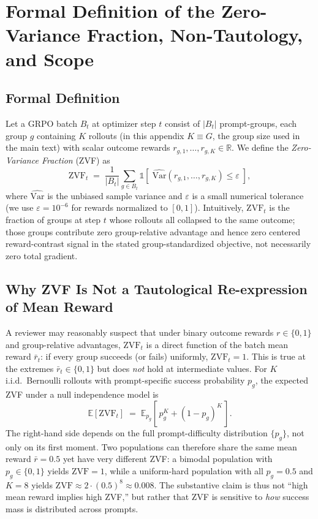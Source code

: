 \section{Formal Definition of the Zero-Variance Fraction, Non-Tautology, and Scope}
\label{sec:appendix:zvf-formalization}

\subsection{Formal Definition}

Let a GRPO batch $B_t$ at optimizer step $t$ consist of $|B_t|$ prompt-groups,
each group $g$ containing $K$ rollouts (in this appendix $K\equiv G$, the group size used in the main text) with scalar outcome rewards
$r_{g,1}, \ldots, r_{g,K} \in \mathbb{R}$. We define the \emph{Zero-Variance
Fraction} (ZVF) as
\begin{equation}
\label{eq:zvf}
\mathrm{ZVF}_t \;=\; \frac{1}{|B_t|} \sum_{g \in B_t}
  \mathbb{1}\!\left[\;\widehat{\mathrm{Var}}(r_{g,1}, \ldots, r_{g,K}) \le \varepsilon\;\right],
\end{equation}
where $\widehat{\mathrm{Var}}$ is the unbiased sample variance and
$\varepsilon$ is a small numerical tolerance
(we use $\varepsilon = 10^{-6}$ for rewards normalized to $[0,1]$).
Intuitively, $\mathrm{ZVF}_t$ is the fraction of groups at step $t$ whose
rollouts all collapsed to the same outcome; those groups contribute zero
group-relative advantage and hence zero centered reward-contrast signal in the
stated group-standardized objective, not necessarily zero total gradient.

\subsection{Why ZVF Is Not a Tautological Re-expression of Mean Reward}

A reviewer may reasonably suspect that under binary outcome rewards
$r \in \{0,1\}$ and group-relative advantages, $\mathrm{ZVF}_t$ is a direct
function of the batch mean reward $\bar{r}_t$: if every group succeeds
(or fails) uniformly, $\mathrm{ZVF}_t = 1$. This is true at the extremes
$\bar{r}_t \in \{0,1\}$ but does \emph{not} hold at intermediate values.
For $K$ i.i.d.~Bernoulli rollouts with prompt-specific success probability
$p_g$, the expected ZVF under a null independence model is
\begin{equation}
\mathbb{E}[\mathrm{ZVF}_t] \;=\; \mathbb{E}_{p_g}\!\left[\,p_g^{K} + (1-p_g)^{K}\,\right].
\end{equation}
The right-hand side depends on the full prompt-difficulty distribution
$\{p_g\}$, not only on its first moment. Two populations can therefore
share the same mean reward $\bar r = 0.5$ yet have very different ZVF:
a bimodal population with $p_g \in \{0,1\}$ yields $\mathrm{ZVF}=1$,
while a uniform-hard population with all $p_g = 0.5$ and $K=8$ yields
$\mathrm{ZVF} \approx 2 \cdot (0.5)^8 \approx 0.008$. The substantive
claim is thus not ``high mean reward implies high ZVF,'' but rather that
ZVF is sensitive to \emph{how} success mass is distributed across prompts.

